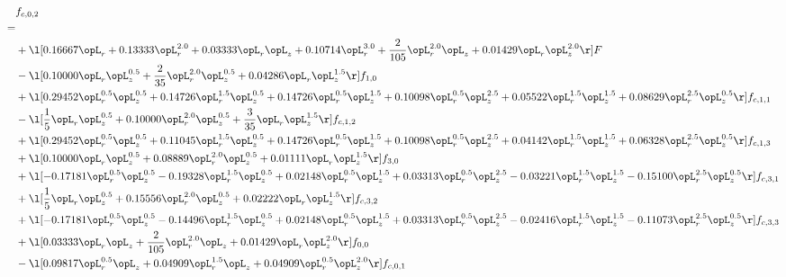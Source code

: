 \begin{alignat}{2} 
\label{eq:f_02_1} 
& f_{c,0,2} \nonumber \\ 
 = \\ 
& + \l[  0.16667 \opL_r +  0.13333 \opL_r^{2.0} +  0.03333 \opL_r \opL_z +  0.10714 \opL_r^{3.0} + \frac{2}{105} \opL_r^{2.0} \opL_z +  0.01429 \opL_r \opL_z^{2.0}  \r] F \nonumber \\ 
& - \l[  0.10000 \opL_r \opL_z^{0.5} + \frac{2}{35} \opL_r^{2.0} \opL_z^{0.5} +  0.04286 \opL_r \opL_z^{1.5}  \r] f_{1,0} \nonumber \\ 
& + \l[  0.29452 \opL_r^{0.5} \opL_z^{0.5} +  0.14726 \opL_r^{1.5} \opL_z^{0.5} +  0.14726 \opL_r^{0.5} \opL_z^{1.5} +  0.10098 \opL_r^{0.5} \opL_z^{2.5} +  0.05522 \opL_r^{1.5} \opL_z^{1.5} +  0.08629 \opL_r^{2.5} \opL_z^{0.5}  \r] f_{c,1,1} \nonumber \\ 
& - \l[ \frac{1}{5} \opL_r \opL_z^{0.5} +  0.10000 \opL_r^{2.0} \opL_z^{0.5} + \frac{3}{35} \opL_r \opL_z^{1.5}  \r] f_{c,1,2} \nonumber \\ 
& + \l[  0.29452 \opL_r^{0.5} \opL_z^{0.5} +  0.11045 \opL_r^{1.5} \opL_z^{0.5} +  0.14726 \opL_r^{0.5} \opL_z^{1.5} +  0.10098 \opL_r^{0.5} \opL_z^{2.5} +  0.04142 \opL_r^{1.5} \opL_z^{1.5} +  0.06328 \opL_r^{2.5} \opL_z^{0.5}  \r] f_{c,1,3} \nonumber \\ 
& + \l[  0.10000 \opL_r \opL_z^{0.5} +  0.08889 \opL_r^{2.0} \opL_z^{0.5} +  0.01111 \opL_r \opL_z^{1.5}  \r] f_{3,0} \nonumber \\ 
& + \l[  -0.17181 \opL_r^{0.5} \opL_z^{0.5}   -0.19328 \opL_r^{1.5} \opL_z^{0.5} +  0.02148 \opL_r^{0.5} \opL_z^{1.5} +  0.03313 \opL_r^{0.5} \opL_z^{2.5}   -0.03221 \opL_r^{1.5} \opL_z^{1.5}   -0.15100 \opL_r^{2.5} \opL_z^{0.5}  \r] f_{c,3,1} \nonumber \\ 
& + \l[ \frac{1}{5} \opL_r \opL_z^{0.5} +  0.15556 \opL_r^{2.0} \opL_z^{0.5} +  0.02222 \opL_r \opL_z^{1.5}  \r] f_{c,3,2} \nonumber \\ 
& + \l[  -0.17181 \opL_r^{0.5} \opL_z^{0.5}   -0.14496 \opL_r^{1.5} \opL_z^{0.5} +  0.02148 \opL_r^{0.5} \opL_z^{1.5} +  0.03313 \opL_r^{0.5} \opL_z^{2.5}   -0.02416 \opL_r^{1.5} \opL_z^{1.5}   -0.11073 \opL_r^{2.5} \opL_z^{0.5}  \r] f_{c,3,3} \nonumber \\ 
& + \l[  0.03333 \opL_r \opL_z + \frac{2}{105} \opL_r^{2.0} \opL_z +  0.01429 \opL_r \opL_z^{2.0}  \r] f_{0,0} \nonumber \\ 
& - \l[  0.09817 \opL_r^{0.5} \opL_z +  0.04909 \opL_r^{1.5} \opL_z +  0.04909 \opL_r^{0.5} \opL_z^{2.0}  \r] f_{c,0,1} \nonumber \\ 

\end{alignat}

